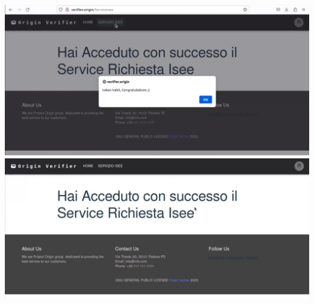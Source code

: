 \begin{center}
\includegraphics[scale = 0.2]{./res/img/verifier/tokenvalido.png}
\includegraphics[scale = 0.2]{./res/img/verifier/accessoservizio.png}
\end{center}